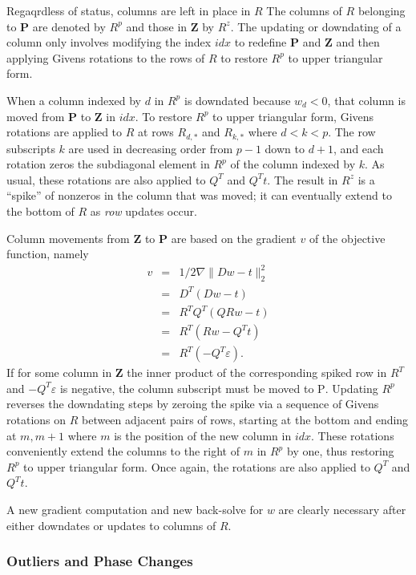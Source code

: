 Regaqrdless of status, columns are left in place in $R$
The columns of $R$ belonging to \textbf{P} are denoted by $R^p$ and those in \textbf{Z} by $R^z$.
The updating or downdating of a column only involves modifying the index $idx$ to redefine \textbf{P} and \textbf{Z} and then
applying Givens rotations to the rows of $R$ to restore $R^p$ to upper triangular form.

When a column indexed by $d$ in $R^p$ is downdated because $w_d < 0$, that column is moved from \textbf{P} to \textbf{Z} in $idx$.
To restore $R^p$ to upper triangular form, Givens rotations are applied to $R$ at rows $R_{d,*}$ and $R_{k,*}$
where $d < k < p$. The row subscripts $k$ are used in decreasing order from $p-1$ down to $d+1$,
and each rotation zeros the subdiagonal element in $R^p$ of the column indexed by $k$.
As usual, these rotations are also applied to $Q^T$ and $Q^Tt$.
The result in $R^z$ is a ``spike'' of nonzeros in the column that was moved;
it can eventually extend to the bottom of $R$ as \emph{row} updates occur.

Column movements from \textbf{Z} to \textbf{P} are based on the gradient $v$ of the objective function, namely
\begin{eqnarray*}
v &=& 1/2\nabla\|Dw - t\|^2_2 \\
  &=& D^T(Dw - t)             \\
  &=& R^TQ^T(QRw - t)         \\
  &=& R^T(Rw - Q^Tt)          \\
  &=& R^T(-Q^T\varepsilon).
\end{eqnarray*}
If for some column in \textbf{Z} the inner product of the corresponding spiked row in $R^T$ and $-Q^T\varepsilon$ is negative,
the column subscript must be moved to \textsc{P}.
Updating $R^p$ reverses the downdating steps by zeroing the spike via a sequence of Givens rotations on $R$
between adjacent pairs of rows, starting at the bottom and ending at $m,m+1$ where $m$ is the position of the new column in $idx$.
These rotations conveniently extend the columns to the right of $m$ in $R^p$ by one,
thus restoring $R^p$ to upper triangular form. Once again, the rotations are also applied to $Q^T$ and $Q^Tt$.

A new gradient computation and new back-solve for $w$ are clearly necessary after either downdates or updates to columns of $R$.




\subsubsection*{Outliers and Phase Changes}



